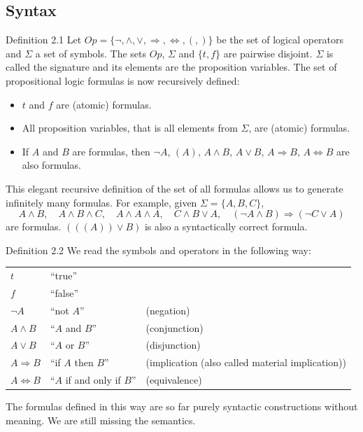\documentclass[10pt]{book}
\begin{document}
\subsection{Syntax}
Definition 2.1 Let $Op=\{\neg, \wedge, \vee, \Rightarrow, \Leftrightarrow, (, )\}$ be the set of logical operators and $\Sigma$ a set of symbols. The sets $Op$, $\Sigma$ and $\{t, f\}$ are pairwise disjoint. $\Sigma$ is called the signature and its elements are the proposition variables. The set of propositional logic formulas is now recursively defined:
\begin{itemize}
  \item $t$ and $f$ are (atomic) formulas.
  \item All proposition variables, that is all elements from $\Sigma$, are (atomic) formulas.
  \item If $A$ and $B$ are formulas, then $\neg A$, $(A)$, $A \wedge B$, $A \vee B$, $A \Rightarrow B$, $A \Leftrightarrow B$ are also formulas.
\end{itemize}

This elegant recursive definition of the set of all formulas allows us to generate infinitely many formulas. For example, given $\Sigma=\{A, B, C\}$,
\[
A \wedge B, \quad A \wedge B \wedge C, \quad A \wedge A \wedge A, \quad C \wedge B \vee A, \quad (\neg A \wedge B) \Rightarrow (\neg C \vee A)
\]
are formulas. $(((A)) \vee B)$ is also a syntactically correct formula.

Definition 2.2 We read the symbols and operators in the following way:
\begin{center}
\begin{tabular}{lll}
$t$ & ``true'' & \\
$f$ & ``false'' & \\
$\neg A$ & ``not $A$'' & (negation) \\
$A \wedge B$ & ``$A$ and $B$'' & (conjunction) \\
$A \vee B$ & ``$A$ or $B$'' & (disjunction) \\
$A \Rightarrow B$ & ``if $A$ then $B$'' & (implication (also called material implication)) \\
$A \Leftrightarrow B$ & ``$A$ if and only if $B$'' & (equivalence) \\
\end{tabular}
\end{center}

The formulas defined in this way are so far purely syntactic constructions without meaning. We are still missing the semantics.
\end{document}
